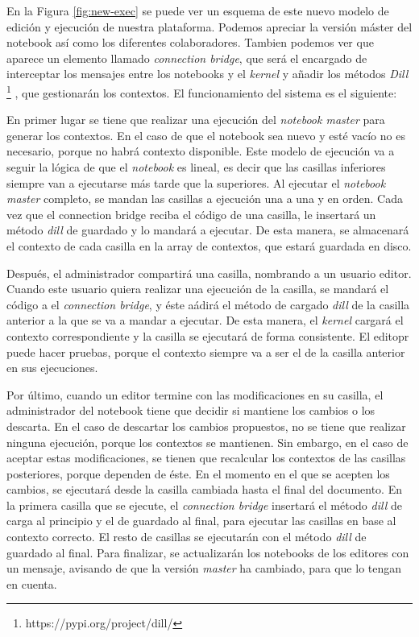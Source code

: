 \documentclass[11pt,spanish,listoffigures,listoftables]{tfgetsinf}
\begin{document}
En la Figura \ref{fig:new-exec} se puede ver un esquema de este nuevo modelo de edición y ejecución de nuestra plataforma. Podemos apreciar la versión máster del notebook así como los diferentes colaboradores. Tambien podemos ver que aparece un elemento llamado \textit{connection bridge}, que será el encargado de interceptar los mensajes entre los notebooks y el \textit{kernel} y añadir los métodos \textit{Dill} \footnote{https://pypi.org/project/dill/} , que gestionarán los contextos. El funcionamiento del sistema es el siguiente:

En primer lugar se tiene que realizar una ejecución del \textit{notebook master} para generar los contextos. En el caso de que el notebook sea nuevo y esté vacío no es necesario, porque no habrá contexto disponible. Este modelo de ejecución va a seguir la lógica de que el \textit{notebook} es lineal, es decir que las casillas inferiores siempre van a ejecutarse más tarde que la superiores. Al ejecutar el \textit{notebook master} completo, se mandan las casillas a ejecución una a una y en orden. Cada vez que el connection bridge reciba el código de una casilla, le insertará un método \textit{dill} de guardado y lo mandará a ejecutar. De esta manera, se almacenará el contexto de cada casilla en la array de contextos, que estará guardada en disco. 

Después, el administrador compartirá una casilla, nombrando a un usuario editor. Cuando este usuario quiera realizar una ejecución de la casilla, se mandará el código a el \textit{connection bridge}, y éste aádirá el método de cargado \textit{dill} de la casilla anterior a la que se va a mandar a ejecutar. De esta manera, el \textit{kernel} cargará el contexto correspondiente y la casilla se ejecutará de forma consistente. El editopr puede hacer pruebas, porque el contexto siempre va a ser el de la casilla anterior en sus ejecuciones.

Por último, cuando un editor termine con las modificaciones en su casilla, el administrador del notebook tiene que decidir si mantiene los cambios o los descarta. En el caso de descartar los cambios propuestos, no se tiene que realizar ninguna ejecución, porque los contextos se mantienen. Sin embargo, en el caso de aceptar estas modificaciones, se tienen que recalcular los contextos de las casillas posteriores, porque dependen de éste. En el momento en el que se acepten los cambios, se ejecutará desde la casilla cambiada hasta el final del documento.  En la primera casilla que se ejecute, el \textit{connection bridge} insertará el método \textit{dill} de carga al principio y el de guardado al final, para ejecutar las casillas en base al contexto correcto. El resto de casillas se ejecutarán con el método \textit{dill} de guardado al final. Para finalizar, se actualizarán los notebooks de los editores con un mensaje, avisando de que la versión \textit{master} ha cambiado, para que lo tengan en cuenta.
\end{document}
